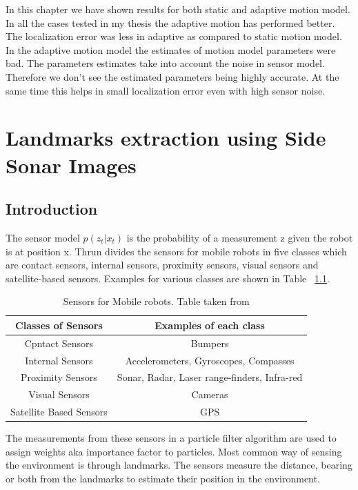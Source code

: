 \documentclass[12pt]{dalcsthesis}
\begin{document}
In this chapter we have shown results for both static and adaptive motion model. In all the cases tested in my thesis the adaptive motion has performed better. The localization error was less in adaptive as compared to static motion model. In the adaptive motion model the estimates of motion model parameters were bad. The parameters estimates take into account the noise in sensor model. Therefore we don't see the estimated parameters being highly accurate. At the same time this helps in small localization error even with high sensor noise. 


\chapter{Landmarks extraction using Side Sonar Images}
\section{Introduction}
The sensor model $p(z_{t}|x_{t})$ is the probability of a measurement z given the robot is at position x. Thrun \cite{thrun2005probabilistic} divides the sensors for mobile robots in five classes which are contact sensors, internal sensors, proximity sensors, visual sensors and satellite-based sensors. Examples for various classes are shown in Table ~\ref{tab-: classes of sensors}.

\begin {table}[tbh]
\centering
\begin{tabular}{|c|c|}
\hline 
\textbf{Classes of Sensors} & \textbf{ Examples of each class} \\ 
\hline 
Cpntact Sensors & Bumpers \\ 
\hline 
Internal Sensors & Accelerometers, Gyroscopes, Compasses \\ 
\hline 
Proximity Sensors & Sonar, Radar, Laser range-finders, Infra-red \\ 
\hline 
Visual Sensors  & Cameras \\ 
\hline 
Satellite Based Sensors & GPS \\ 
\hline 
\end{tabular}
\caption{\label{tab-: classes of sensors} Sensors for Mobile robots. Table taken from \cite{thrun2005probabilistic}}
\end{table}
The measurements from these sensors in a particle filter algorithm are used to assign weights aka importance factor to particles. Most common way of sensing the environment is through landmarks. The sensors measure the distance,	 bearing or both from the landmarks to estimate their position in the environment. 
\end{document}
